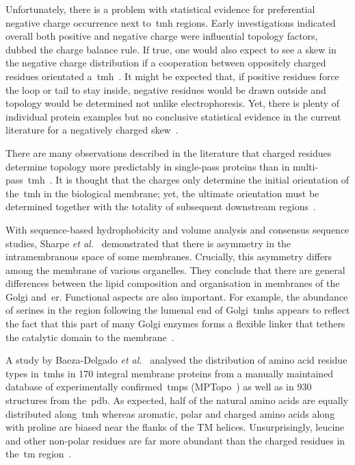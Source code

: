 Unfortunately, there is a problem with statistical evidence for preferential negative charge occurrence next to~\gls{tmh} regions.
Early investigations indicated overall both positive and negative charge were influential topology factors, dubbed the charge balance rule.
If true, one would also expect to see a skew in the negative charge distribution if a cooperation between oppositely charged residues orientated a~\gls{tmh}~\cite{Sipos1993, Hartmann1989}.
It might be expected that, if positive residues force the loop or tail to stay inside, negative residues would be drawn outside and topology would be determined not unlike electrophoresis.
Yet, there is plenty of individual protein examples but no conclusive statistical evidence in the current literature for a negatively charged skew~\cite{Sharpe2010, Baeza-Delgado2013, Granseth2005, Pogozheva2013, Nilsson2005a, Andersson1992}.

There are many observations described in the literature that charged residues determine topology more predictably in single-pass proteins than in multi-pass~\gls{tmh}~\cite{Kim1994, Harley1998}.
It is thought that the charges only determine the initial orientation of the~\gls{tmh} in the biological membrane; yet, the ultimate orientation must be determined together with the totality of subsequent downstream regions~\cite{Sato1998}.

With sequence-based hydrophobicity and volume analysis and consensus sequence studies, Sharpe \textit{et al.}~\cite{Sharpe2010} demonstrated that there is asymmetry in the intramembranous space of some membranes.
Crucially, this asymmetry differs among the membrane of various organelles.
They conclude that there are general differences between the lipid composition and organisation in membranes of the Golgi and~\gls{er}.
Functional aspects are also important.
For example, the abundance of serines in the region following the lumenal end of Golgi~\gls{tmh}s appears to reflect the fact that this part of many Golgi enzymes forms a flexible linker that tethers the catalytic domain to the membrane~\cite{Sharpe2010}.

A study by Baeza-Delgado \textit{et al.}~\cite{Baeza-Delgado2013} analysed the distribution of amino acid residue types in~\gls{tmh}s in 170 integral membrane proteins from a manually maintained database of experimentally confirmed~\gls{tmp}s (MPTopo~\cite{Jayasinghe2001}) as well as in 930 structures from the~\gls{pdb}.
As expected, half of the natural amino acids are equally distributed along~\gls{tmh} whereas aromatic, polar and charged amino acids along with proline are biased near the flanks of the TM helices.
Unsurprisingly, leucine and other non-polar residues are far more abundant than the charged residues in the~\gls{tm} region~\cite{Sharpe2010, Baeza-Delgado2013}.

